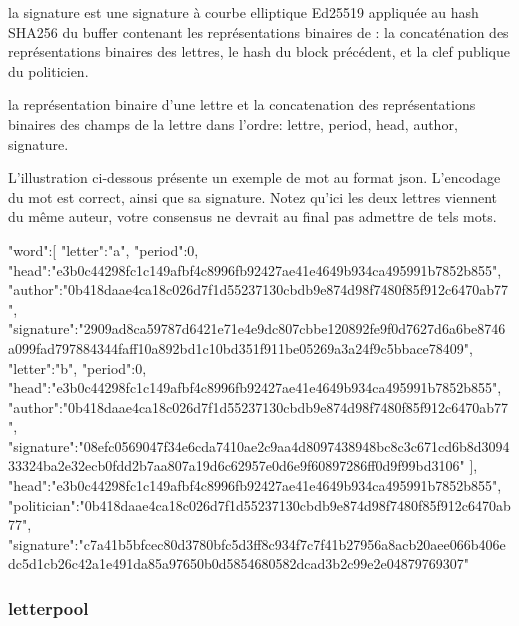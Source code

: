 \documentclass{article}
\begin{document}
 la signature est une signature à courbe elliptique Ed25519 appliquée
 au hash SHA256 du buffer contenant les représentations binaires de :
 la concaténation des représentations binaires des lettres, le hash du
 block précédent, et la clef publique du politicien.

 la représentation binaire d'une lettre et la concatenation des
 représentations binaires des champs de la lettre dans l'ordre:
 lettre, period, head, author, signature.

 L'illustration ci-dessous présente un exemple de mot au
 format json. L'encodage du mot est correct, ainsi que sa
 signature. Notez qu'ici les deux lettres viennent du même auteur,
 votre consensus ne devrait au final pas admettre de tels mots.

\begin{jsonMessage}
   { "word":[ { "letter":"a", "period":0,
       "head":"e3b0c44298fc1c149afbf4c8996fb92427ae41e4649b934ca495991b7852b855",
       "author":"0b418daae4ca18c026d7f1d55237130cbdb9e874d98f7480f85f912c6470ab77",
       "signature":"2909ad8ca59787d6421e71e4e9dc807cbbe120892fe9f0d7627d6a6be8746a099fad797884344faff10a892bd1c10bd351f911be05269a3a24f9c5bbace78409"},
     { "letter":"b", "period":0,
       "head":"e3b0c44298fc1c149afbf4c8996fb92427ae41e4649b934ca495991b7852b855",
       "author":"0b418daae4ca18c026d7f1d55237130cbdb9e874d98f7480f85f912c6470ab77",
       "signature":"08efc0569047f34e6cda7410ae2c9aa4d8097438948bc8c3c671cd6b8d309433324ba2e32ecb0fdd2b7aa807a19d6c62957e0d6e9f60897286ff0d9f99bd3106"}
     ],
     "head":"e3b0c44298fc1c149afbf4c8996fb92427ae41e4649b934ca495991b7852b855",
     "politician":"0b418daae4ca18c026d7f1d55237130cbdb9e874d98f7480f85f912c6470ab77",
     "signature":"c7a41b5bfcec80d3780bfc5d3ff8c934f7c7f41b27956a8acb20aee066b406edc5d1cb26c42a1e491da85a97650b0d5854680582dcad3b2c99e2e04879769307"}
\end{jsonMessage}


 \subsubsection{letterpool}
 \label{sec:letterpool}
\end{document}
